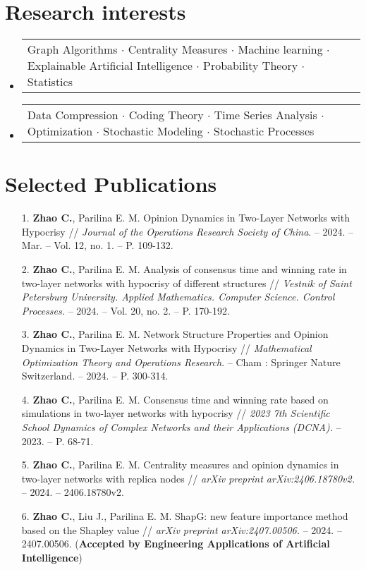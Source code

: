 \documentclass[letterpaper,10pt]{article}
\makeatletter
\newcommand{\resumeProjectHeading}[2]{
  \item
  \begin{tabular*}{0.97\textwidth}{l@{\extracolsep{\fill}}r}
    \small#1 & #2 \\
  \end{tabular*}\vspace{-7pt}
}
\newenvironment{resumeSubHeadingList}{\begin{itemize}[leftmargin=0.15in, label={}]}{\end{itemize}}
\makeatother
\begin{document}
\section{Research interests}
\begin{resumeSubHeadingList}
  \resumeProjectHeading{
    Graph Algorithms $\cdot$ Centrality Measures $\cdot$ Machine learning
    $\cdot$ Explainable Artificial Intelligence $\cdot$ Probability Theory
    $\cdot$ Statistics}{}
  \resumeProjectHeading{
    Data Compression $\cdot$ Coding Theory $\cdot$ Time Series Analysis $\cdot$
    Optimization $\cdot$ Stochastic Modeling $\cdot$ Stochastic Processes}{}
\end{resumeSubHeadingList}

\section{Selected Publications}
\begin{enumerate}
  \fontsize{10}{10.5}\selectfont
  \item [1.] \textbf{Zhao C.}, Parilina E. M. Opinion Dynamics in Two-Layer Networks with Hypocrisy // {\it Journal of the Operations Research Society of China}. -- 2024. -- Mar. -- Vol. 12, no. 1. -- P. 109-132.
  \item [2.] \textbf{Zhao C.}, Parilina E. M. Analysis of consensus time and winning rate in two-layer networks with hypocrisy of different structures // {\it Vestnik of Saint Petersburg University. Applied Mathematics. Computer Science. Control Processes.} -- 2024. -- Vol. 20, no. 2. -- P. 170-192.
  \item [3.] \textbf{Zhao C.}, Parilina E. M. Network Structure Properties and Opinion Dynamics in Two-Layer Networks with Hypocrisy // {\it Mathematical Optimization Theory and Operations Research}. -- Cham : Springer Nature Switzerland. -- 2024. -- P. 300-314.
  \item [4.] \textbf{Zhao C.}, Parilina E. M. Consensus time and winning rate based on simulations in two-layer networks with hypocrisy // {\it 2023 7th Scientific School Dynamics of Complex Networks and their Applications (DCNA).} -- 2023. -- P. 68-71.
  \item [5.] \textbf{Zhao C.}, Parilina E. M. Centrality measures and opinion dynamics in two-layer networks with replica nodes // {\it arXiv preprint arXiv:2406.18780v2.} -- 2024. -- 2406.18780v2.
  \item [6.] \textbf{Zhao C.}, Liu J., Parilina E. M. ShapG: new feature importance method based on the Shapley value // {\it arXiv preprint arXiv:2407.00506.} -- 2024. -- 2407.00506. ({\bf Accepted by Engineering Applications of Artificial Intelligence})
\end{enumerate}
\end{document}
